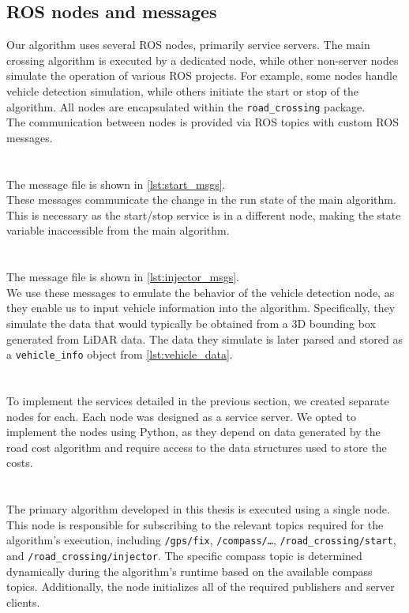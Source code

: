     \subsection{ROS nodes and messages}
        Our algorithm uses several ROS nodes, primarily service servers. The main crossing algorithm is executed by a dedicated node, while other non-server nodes simulate the operation of various ROS projects. For example, some nodes handle vehicle detection simulation, while others initiate the start or stop of the algorithm. All nodes are encapsulated within the \texttt{road\_crossing} package.\\
        The communication between nodes is provided via ROS topics with custom ROS messages.\\\\
        \\
            The message file is shown in \ref{lst:start_msgs}.\\
            These messages communicate the change in the run state of the main algorithm. This is necessary as the start/stop service is in a different node, making the state variable inaccessible from the main algorithm.\\\\
        \\
            The message file is shown in \ref{lst:injector_msgs}.\\
            We use these messages to emulate the behavior of the vehicle detection node, as they enable us to input vehicle information into the algorithm. Specifically, they simulate the data that would typically be obtained from a 3D bounding box generated from LiDAR data. The data they simulate is later parsed and stored as a \texttt{vehicle\_info} object from \ref{lst:vehicle_data}.\\\\
        \\
            To implement the services detailed in the previous section, we created separate nodes for each. Each node was designed as a service server. We opted to implement the nodes using Python, as they depend on data generated by the road cost algorithm and require access to the data structures used to store the costs.\\\\
        \\
            The primary algorithm developed in this thesis is executed using a single node. This node is responsible for subscribing to the relevant topics required for the algorithm's execution, including \texttt{/gps/fix}, \texttt{/compass/\ldots}, \texttt{/road\_crossing/start}, and \texttt{/road\_crossing/injector}. The specific compass topic is determined dynamically during the algorithm's runtime based on the available compass topics. Additionally, the node initializes all of the required publishers and server clients.\\

